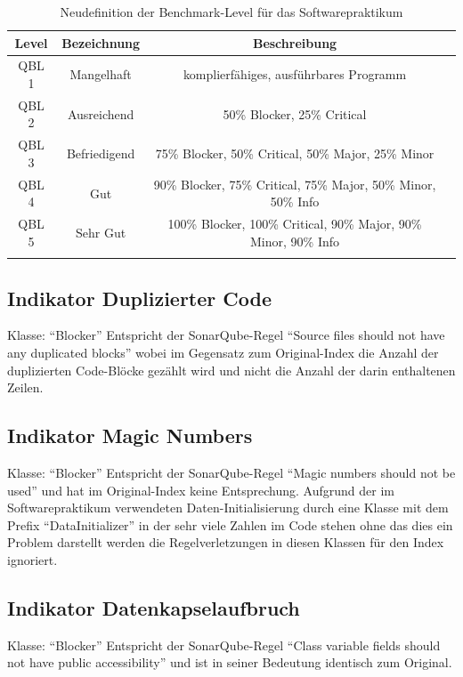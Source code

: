 \documentclass[da,ngerman]{stthesis}
\begin{document}
			\begin{center}
				\tabulinesep=1.5mm
				\begin{longtabu}{|c|c|c|c|}
					\hline
  					\textbf{Level} & \textbf{Bezeichnung} & \textbf{Beschreibung} \\
  					\hline 
					QBL 1 & Mangelhaft & komplierfähiges, ausführbares Programm \\  						\hline
  					QBL 2 & Ausreichend & 50\% Blocker, 25\% Critical \\ 
  					\hline
  					QBL 3 & Befriedigend & 75\% Blocker, 50\% Critical, 50\% Major, 25\% Minor \\
  					\hline
  					QBL 4 & Gut & 90\% Blocker, 75\% Critical, 75\% Major, 50\% Minor, 50\% Info \\
  					\hline
  					QBL 5 & Sehr Gut & 100\% Blocker, 100\% Critical, 90\% Major, 90\% Minor, 90\% Info \\
  					\hline
  					\caption{Neudefinition der Benchmark-Level für das Softwarepraktikum}
					\label{indexdef}
  				\end{longtabu}   
  			\end{center}
  			\subsection{Indikator Duplizierter Code}
  				Klasse: "`Blocker"' \newline
  				Entspricht der SonarQube-Regel "`Source files should not have any duplicated blocks"' wobei im Gegensatz zum Original-Index die Anzahl der duplizierten Code-Blöcke gezählt wird und nicht die Anzahl der darin enthaltenen Zeilen.
  			\subsection{Indikator Magic Numbers}
  				Klasse: "`Blocker"' \newline
  				Entspricht der SonarQube-Regel "`Magic numbers should not be used"' und hat im Original-Index keine Entsprechung. Aufgrund der im Softwarepraktikum verwendeten Daten-Initialisierung durch eine Klasse mit dem Prefix "`DataInitializer"' in der sehr viele Zahlen im Code stehen ohne das dies ein Problem darstellt werden die Regelverletzungen in diesen Klassen für den Index ignoriert.
  			\subsection{Indikator Datenkapselaufbruch}
  				Klasse: "`Blocker"' \newline
  				Entspricht der SonarQube-Regel "`Class variable fields should not have public accessibility"' und ist in seiner Bedeutung identisch zum Original.
\end{document}
